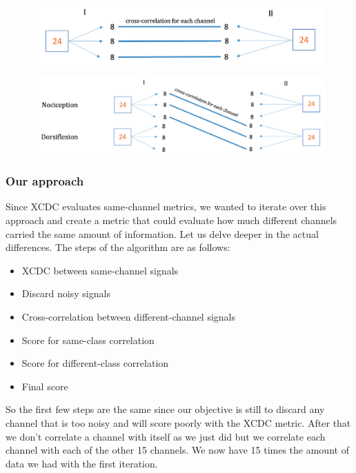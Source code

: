 \documentclass{Configuration_Files/PoliMi3i_thesis}
\begin{document}
\begin{figure}[H]
	\includegraphics[scale=0.4]{dataSplit.png}
	\centering
	\end{figure}



	\begin{figure}[H]
		\includegraphics[scale=0.4]{scoreDifferentClass.png}
		\centering
		\end{figure}
	

\subsubsection{Our approach}

Since XCDC evaluates same-channel metrics, we wanted to iterate over this approach and create a metric that could evaluate how much different channels carried the same amount of information.
Let us delve deeper in the actual differences.
The steps of the algorithm are as follows:

\begin{itemize}
	\item XCDC between same-channel signals
	\item Discard noisy signals
	\item Cross-correlation between different-channel signals
	\item Score for same-class correlation
	\item Score for different-class correlation
	\item Final score
\end{itemize}

So the first few steps are the same since our objective is still to discard any channel that is too noisy and will score poorly with the XCDC metric.
After that we don't correlate a channel with itself as we just did but we correlate each channel with each of the other 15 channels.
We now have 15 times the amount of data we had with the first iteration.
\end{document}
